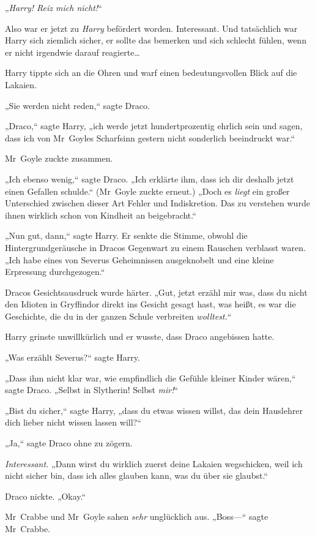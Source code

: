{„\emph{Harry! Reiz mich nicht!}“

Also war er jetzt zu \emph{Harry} befördert worden. Interessant. Und tatsächlich war Harry sich ziemlich sicher, er sollte das bemerken und sich schlecht fühlen, wenn er nicht irgendwie darauf reagierte…

Harry tippte sich an die Ohren und warf einen bedeutungsvollen Blick auf die Lakaien.

„Sie werden nicht reden,“ sagte Draco.

„Draco,“ sagte Harry, „ich werde jetzt hundertprozentig ehrlich sein und sagen, dass ich von Mr~Goyles Scharfsinn gestern nicht sonderlich beeindruckt war.“

Mr~Goyle zuckte zusammen.

„Ich ebenso wenig,“ sagte Draco. „Ich erklärte ihm, dass ich dir deshalb jetzt einen Gefallen schulde.“ (Mr~Goyle zuckte erneut.) „Doch es \emph{liegt} ein großer Unterschied zwischen dieser Art Fehler und Indiskretion. Das zu verstehen wurde ihnen wirklich schon von Kindheit an beigebracht.“

„Nun gut, dann,“ sagte Harry. Er senkte die Stimme, obwohl die Hintergrundgeräusche in Dracos Gegenwart zu einem Rauschen verblasst waren. „Ich habe eines von Severus Geheimnissen ausgeknobelt und eine kleine Erpressung durchgezogen.“

Dracos Gesichtsausdruck wurde härter. „Gut, jetzt erzähl mir was, dass du nicht den Idioten in Gryffindor direkt ins Gesicht gesagt hast, was heißt, es war die Geschichte, die du in der ganzen Schule verbreiten \emph{wolltest.}“

Harry grinste unwillkürlich und er wusste, dass Draco angebissen hatte.

„Was erzählt Severus?“ sagte Harry.

„Dass ihm nicht klar war, wie empfindlich die Gefühle kleiner Kinder wären,“ sagte Draco. „Selbst in Slytherin! Selbst \emph{mir!}“

„Bist du sicher,“ sagte Harry, „dass du etwas wissen willst, das dein Hauslehrer dich lieber nicht wissen lassen will?“

„Ja,“ sagte Draco ohne zu zögern.

\emph{Interessant.} „Dann wirst du wirklich zuerst deine Lakaien wegschicken, weil ich nicht sicher bin, dass ich alles glauben kann, was du über sie glaubst.“

Draco nickte. „Okay.“

Mr~Crabbe und Mr~Goyle sahen \emph{sehr} unglücklich aus. „Boss—“ sagte Mr~Crabbe.

}
